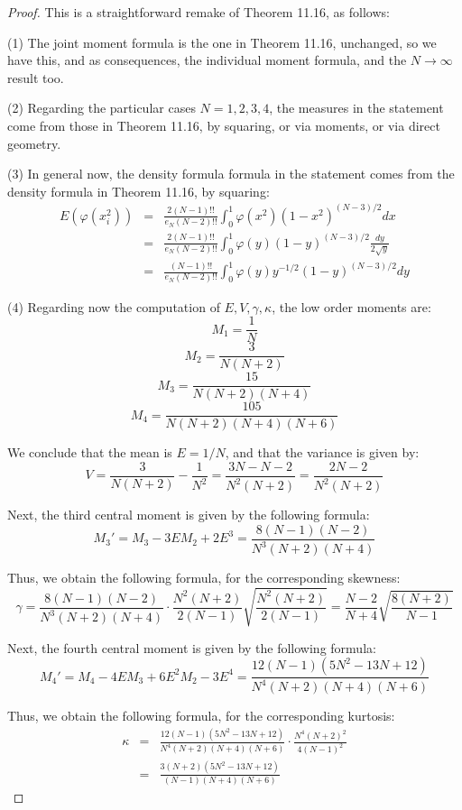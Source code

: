 \documentclass[12pt]{amsbook}
\begin{document}
\begin{proof}
This is a straightforward remake of Theorem 11.16, as follows:

\medskip

(1) The joint moment formula is the one in Theorem 11.16, unchanged, so we have this, and as consequences, the individual moment formula, and the $N\to\infty$ result too.

\medskip

(2) Regarding the particular cases $N=1,2,3,4$, the measures in the statement come from those in Theorem 11.16, by squaring, or via moments, or via direct geometry.

\medskip

(3) In general now, the density formula formula in the statement comes from the density formula in Theorem 11.16, by squaring:
\begin{eqnarray*}
E(\varphi(x_i^2))
&=&\frac{2(N-1)!!}{e_N(N-2)!!}\int_0^1\varphi(x^2)(1-x^2)^{(N-3)/2}dx\\
&=&\frac{2(N-1)!!}{e_N(N-2)!!}\int_0^1\varphi(y)(1-y)^{(N-3)/2}\frac{dy}{2\sqrt{y}}\\
&=&\frac{(N-1)!!}{e_N(N-2)!!}\int_0^1\varphi(y)y^{-1/2}(1-y)^{(N-3)/2}dy
\end{eqnarray*}

(4) Regarding now the computation of $E,V,\gamma,\kappa$, the low order moments are:
$$M_1=\frac{1}{N}$$
$$M_2=\frac{3}{N(N+2)}$$
$$M_3=\frac{15}{N(N+2)(N+4)}$$
$$M_4=\frac{105}{N(N+2)(N+4)(N+6)}$$

We conclude that the mean is $E=1/N$, and that the variance is given by:
$$V=\frac{3}{N(N+2)}-\frac{1}{N^2}=\frac{3N-N-2}{N^2(N+2)}
=\frac{2N-2}{N^2(N+2)}$$

Next, the third central moment is given by the following formula:
$$M_3'=M_3-3EM_2+2E^3=\frac{8(N-1)(N-2)}{N^3(N+2)(N+4)}$$

Thus, we obtain the following formula, for the corresponding skewness:
$$\gamma=\frac{8(N-1)(N-2)}{N^3(N+2)(N+4)}\cdot\frac{N^2(N+2)}{2(N-1)}\sqrt{\frac{N^2(N+2)}{2(N-1)}}=\frac{N-2}{N+4}\sqrt{\frac{8(N+2)}{N-1}}$$

Next, the fourth central moment is given by the following formula:
$$M_4'=M_4-4EM_3+6E^2M_2-3E^4=\frac{12(N-1)(5N^2-13N+12)}{N^4(N+2)(N+4)(N+6)}$$

Thus, we obtain the following formula, for the corresponding kurtosis:
\begin{eqnarray*}
\kappa
&=&\frac{12(N-1)(5N^2-13N+12)}{N^4(N+2)(N+4)(N+6)}\cdot\frac{N^4(N+2)^2}{4(N-1)^2}\\
&=&\frac{3(N+2)(5N^2-13N+12)}{(N-1)(N+4)(N+6)}
\end{eqnarray*}


\end{proof}
\end{document}
